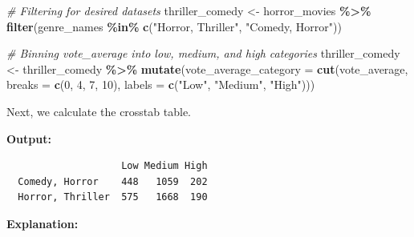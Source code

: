\documentclass[
]{book}
\newenvironment{Shaded}{\begin{snugshade}}{\end{snugshade}}
\newcommand{\AttributeTok}[1]{\textcolor[rgb]{0.13,0.29,0.53}{#1}}
\newcommand{\CommentTok}[1]{\textcolor[rgb]{0.56,0.35,0.01}{\textit{#1}}}
\newcommand{\DecValTok}[1]{\textcolor[rgb]{0.00,0.00,0.81}{#1}}
\newcommand{\FunctionTok}[1]{\textcolor[rgb]{0.13,0.29,0.53}{\textbf{#1}}}
\newcommand{\NormalTok}[1]{#1}
\newcommand{\OtherTok}[1]{\textcolor[rgb]{0.56,0.35,0.01}{#1}}
\newcommand{\SpecialCharTok}[1]{\textcolor[rgb]{0.81,0.36,0.00}{\textbf{#1}}}
\newcommand{\StringTok}[1]{\textcolor[rgb]{0.31,0.60,0.02}{#1}}
\begin{document}
\begin{Shaded}
\begin{Highlighting}[]
\CommentTok{\# Filtering for desired datasets}
\NormalTok{thriller\_comedy }\OtherTok{\textless{}{-}}\NormalTok{ horror\_movies }\SpecialCharTok{\%\textgreater{}\%}
  \FunctionTok{filter}\NormalTok{(genre\_names }\SpecialCharTok{\%in\%} \FunctionTok{c}\NormalTok{(}\StringTok{"Horror, Thriller"}\NormalTok{, }\StringTok{"Comedy, Horror"}\NormalTok{))}

\CommentTok{\# Binning vote\_average into low, medium, and high categories}
\NormalTok{thriller\_comedy }\OtherTok{\textless{}{-}}\NormalTok{ thriller\_comedy }\SpecialCharTok{\%\textgreater{}\%}
  \FunctionTok{mutate}\NormalTok{(}\AttributeTok{vote\_average\_category =} \FunctionTok{cut}\NormalTok{(vote\_average, }
                                     \AttributeTok{breaks =} \FunctionTok{c}\NormalTok{(}\DecValTok{0}\NormalTok{, }\DecValTok{4}\NormalTok{, }\DecValTok{7}\NormalTok{, }\DecValTok{10}\NormalTok{),}
                                     \AttributeTok{labels =} \FunctionTok{c}\NormalTok{(}\StringTok{"Low"}\NormalTok{, }\StringTok{"Medium"}\NormalTok{, }\StringTok{"High"}\NormalTok{)))}
\end{Highlighting}
\end{Shaded}

Next, we calculate the crosstab table.

\begin{Shaded}
\end{Shaded}

\textbf{Output:}

\begin{verbatim}
                    Low Medium High
  Comedy, Horror    448   1059  202
  Horror, Thriller  575   1668  190
\end{verbatim}

\textbf{Explanation:}
\end{document}
